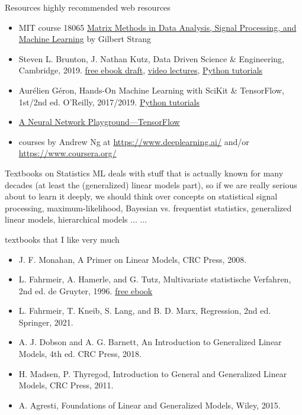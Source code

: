\documentclass[mathserif, aspectratio=1610]{intbeamer}
\begin{document}
\begin{frame}{Resources}
  highly recommended web resources
  \begin{itemize}
    \item MIT course 18065 \href{https://ocw.mit.edu/courses/18-065-matrix-methods-in-data-analysis-signal-processing-and-machine-learning-spring-2018/}{Matrix Methods in Data Analysis, Signal Processing, and Machine Learning} by Gilbert Strang
    \item Steven L. Brunton, J. Nathan Kutz, Data Driven Science \& Engineering, Cambridge, 2019.
    \href{http://www.databookuw.com/databook.pdf}{free ebook draft},
    \href{http://www.databookuw.com/}{video lectures},
    \href{https://github.com/dylewsky/Data_Driven_Science_Python_Demos}{Python tutorials}
    \item Aur\'{e}lien G\'{e}ron, Hands-On Machine Learning with SciKit \& TensorFlow, 1st/2nd ed. O'Reilly, 2017/2019.
    \href{https://github.com/ageron/handson-ml2}{Python tutorials}
    \item \href{https://playground.tensorflow.org}{A Neural Network Playground---TensorFlow}
    \item courses by Andrew Ng at \url{https://www.deeplearning.ai/} and/or \url{https://www.coursera.org/}
  \end{itemize}
\end{frame}

\begin{frame}{Textbooks on Statistics}
    ML deals with stuff that is actually known for many decades (at least the (generalized) linear models part), so if we are really
    serious about to learn it deeply, we should think over concepts on
    statistical signal processing, maximum-likelihood, Bayesian vs. frequentist
    statistics, generalized linear models, hierarchical models ... ...

    textbooks that I like very much
  \begin{itemize}
  \item J. F. Monahan, A Primer on Linear Models, CRC Press, 2008.
  \item L. Fahrmeir, A. Hamerle, and G. Tutz, Multivariate statistische Verfahren, 2nd ed. de Gruyter, 1996.
  \href{https://www.degruyter.com/document/doi/10.1515/9783110816020/html}{free ebook}
  \item L. Fahrmeir, T. Kneib, S. Lang, and B. D. Marx, Regression, 2nd ed. Springer, 2021.
  \item A. J. Dobson and A. G. Barnett, An Introduction to Generalized Linear Models, 4th ed. CRC Press, 2018.
  \item H. Madsen, P. Thyregod, Introduction to General and Generalized Linear Models, CRC Press, 2011.
  \item A. Agresti, Foundations of Linear and Generalized Models, Wiley, 2015.
  \end{itemize}
\end{frame}
\end{document}
